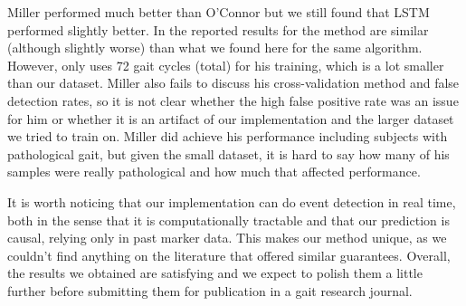 \documentclass{acm_proc_article-sp}
\begin{document}
Miller performed much better than O'Connor but we still found that LSTM performed slightly better. In \cite{Miller2009} the reported results for the method are similar (although slightly worse) than what we found here for the same algorithm. However, \cite{Miller2009} only uses 72 gait cycles (total) for his training, which is a lot smaller than our dataset. Miller also fails to discuss his cross-validation method and false detection rates, so it is not clear whether the high false positive rate was an issue for him or whether it is an artifact of our implementation and the larger dataset we tried to train on. Miller did achieve his performance including subjects with pathological gait, but given the small dataset, it is hard to say how many of his samples were really pathological and how much that affected performance.

It is worth noticing that our implementation can do event detection in real time, both in the sense that it is computationally tractable and that our prediction is causal, relying only in past marker data. This makes our method unique, as we couldn't find anything on the literature that offered similar guarantees. Overall, the results we obtained are satisfying and we expect to polish them a little further before submitting them for publication in a gait research journal.
\end{document}

